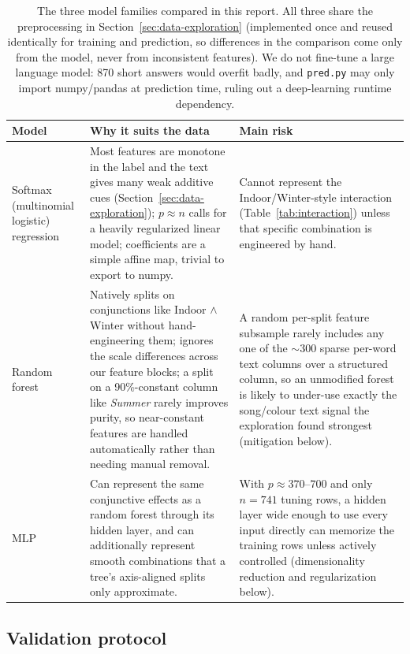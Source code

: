 \documentclass[12pt]{article}
\begin{document}
\begin{table}[h]
\centering
\begin{tabular}{@{}p{3cm}p{5.3cm}p{5.3cm}@{}}
\toprule
Model & Why it suits the data & Main risk \\
\midrule
Softmax (multinomial logistic) regression & Most features are monotone in the label and the text
gives many weak additive cues (Section~\ref{sec:data-exploration}); $p \approx n$ calls for a
heavily regularized linear model; coefficients are a simple affine map, trivial to export to numpy.
& Cannot represent the Indoor/Winter-style interaction (Table~\ref{tab:interaction}) unless that
specific combination is engineered by hand. \\
Random forest & Natively splits on conjunctions like Indoor $\wedge$ Winter without
hand-engineering them; ignores the scale differences across our feature blocks; a split on a
90\%-constant column like \emph{Summer} rarely improves purity, so near-constant features are
handled automatically rather than needing manual removal. & A random per-split feature subsample
rarely includes any one of the $\sim$300 sparse per-word text columns over a structured column, so
an unmodified forest is likely to under-use exactly the song/colour text signal the exploration
found strongest (mitigation below). \\
MLP & Can represent the same conjunctive effects as a random forest through its hidden layer, and
can additionally represent smooth combinations that a tree's axis-aligned splits only approximate.
& With $p\approx 370$--$700$ and only $n=741$ tuning rows, a hidden layer wide enough to use every
input directly can memorize the training rows unless actively controlled (dimensionality reduction
and regularization below). \\
\bottomrule
\end{tabular}
\caption{The three model families compared in this report. All three share the preprocessing in
Section~\ref{sec:data-exploration} (implemented once and reused identically for training and
prediction, so differences in the comparison come only from the model, never from inconsistent
features). We do not fine-tune a large language model: 870 short answers would overfit badly, and
\texttt{pred.py} may only import numpy/pandas at prediction time, ruling out a deep-learning
runtime dependency.}
\label{tab:families}
\end{table}

\subsection{Validation protocol}
\end{document}
